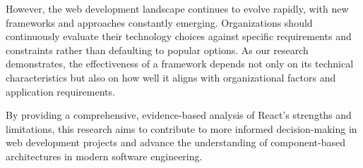 However, the web development landscape continues to evolve rapidly, with new frameworks and approaches constantly emerging. Organizations should continuously evaluate their technology choices against specific requirements and constraints rather than defaulting to popular options. As our research demonstrates, the effectiveness of a framework depends not only on its technical characteristics but also on how well it aligns with organizational factors and application requirements.

By providing a comprehensive, evidence-based analysis of React's strengths and limitations, this research aims to contribute to more informed decision-making in web development projects and advance the understanding of component-based architectures in modern software engineering.
